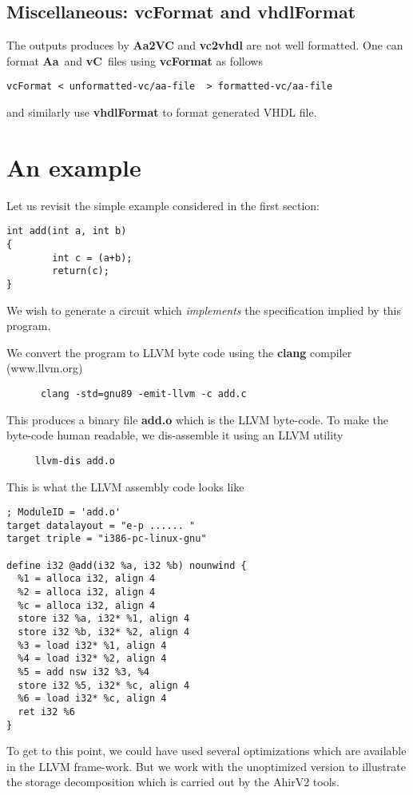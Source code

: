 \documentclass{article}
\newcommand{\Aa}{{\bf Aa}~}
\newcommand{\vC}{{\bf vC}~}
\begin{document}
\subsection{Miscellaneous: {\bf vcFormat} and {\bf vhdlFormat}}

The outputs produces by {\bf Aa2VC} and {\bf vc2vhdl} are
not well formatted.  One can format \Aa and \vC files
using  {\bf vcFormat} as follows
\begin{verbatim}
vcFormat < unformatted-vc/aa-file  > formatted-vc/aa-file
\end{verbatim}
and similarly use {\bf vhdlFormat} to format generated
VHDL file.


\section{An example} \label{sec:Example}

Let us revisit the simple example considered in
the first section:
\begin{verbatim}
int add(int a, int b)
{
        int c = (a+b);
        return(c);
}
\end{verbatim}
We wish to generate a circuit which {\em implements}
the specification implied by this program.

We convert the program to LLVM byte code using
the {\bf clang} compiler (www.llvm.org)
\begin{verbatim}
      clang -std=gnu89 -emit-llvm -c add.c
\end{verbatim}
This produces a binary file {\bf add.o} which is
the LLVM byte-code.  To make the byte-code human
readable, we dis-assemble it using an LLVM utility
\begin{verbatim}
     llvm-dis add.o
\end{verbatim}
This is what the LLVM assembly code looks like
\begin{verbatim}
; ModuleID = 'add.o'
target datalayout = "e-p ...... "
target triple = "i386-pc-linux-gnu"

define i32 @add(i32 %a, i32 %b) nounwind {
  %1 = alloca i32, align 4
  %2 = alloca i32, align 4
  %c = alloca i32, align 4
  store i32 %a, i32* %1, align 4
  store i32 %b, i32* %2, align 4
  %3 = load i32* %1, align 4
  %4 = load i32* %2, align 4
  %5 = add nsw i32 %3, %4
  store i32 %5, i32* %c, align 4
  %6 = load i32* %c, align 4
  ret i32 %6
}
\end{verbatim}
To get to this point, we could have used several
optimizations which are available in the LLVM frame-work.
But we work with the unoptimized version to illustrate
the storage decomposition which is carried out by
the AhirV2 tools.
\end{document}
